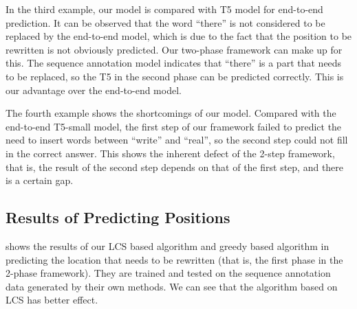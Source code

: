 In the third example, our model is compared with T5 model for end-to-end prediction. It can be observed that the word ``there'' is not considered to be replaced by the end-to-end model, which is due to the fact that the position to be rewritten is not obviously predicted. Our two-phase framework can make up for this. The sequence annotation model indicates that ``there'' is a part that needs to be replaced, so the T5 in the second phase can be predicted correctly. This is our advantage over the end-to-end model.

The fourth example shows the shortcomings of our model. Compared with the end-to-end T5-small model, the first step of our framework failed to predict the need to insert words between ``write'' and ``real'', so the second step could not fill in the correct answer. This shows the inherent defect of the 2-step framework, that is, the result of the second step depends on that of the first step, and there is a certain gap.


\subsection{Results of Predicting Positions}
\label{sec:results-step1}


\begin{table}[ht!]
\centering
\scriptsize
\caption{Results of predicting positions on 3 datasets. ``Ours-greedy'' means to use greedy algorithm to replace the LCS algorithm.}
\label{tab:results-step1}
\end{table}

 shows the results of our LCS based algorithm and greedy based algorithm in predicting the location that needs to be rewritten (that is, the first phase in the 2-phase framework). They are trained and tested on the sequence annotation data generated by their own methods. We can see that the algorithm based on LCS has better effect.
